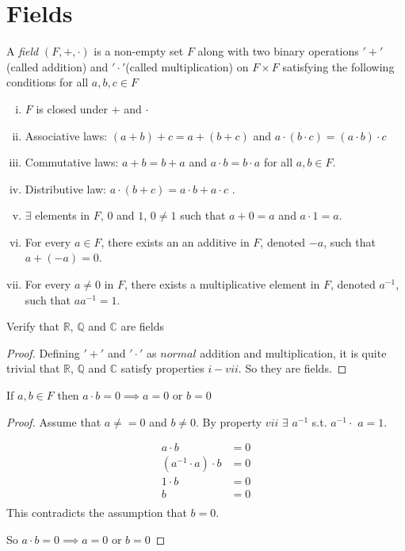 \section{Fields}

\begin{definition}
    A \textit{field} $(F,+,\cdot)$ is a non-empty set $F$ along with two binary operations $'+'$(called addition) and $'\cdot'$(called multiplication) on $F\times F$ satisfying the following conditions for all $a,b,c \in F$
    \begin{enumerate}[(i)]
        \item $F$ is closed under $+$ and $\cdot$
        \item Associative laws: $(a+b)+c=a+(b+c)$ and $a\cdot(b\cdot c)=(a\cdot b)\cdot c$ 
        \item Commutative laws: $a+b=b+a$ and $a\cdot b=b\cdot a$ for all $a,b\in F$.
        \item Distributive law: $a\cdot(b+c)=a\cdot b+a\cdot c$ . 
        \item $\exists$ elements in $F$, $0$ and $1$, $0 \neq 1$ such that $a+0=a$ and $a\cdot 1=a$.
        \item For every $a\in F$, there exists an an additive in $F$, denoted $-a$, such that $a+(-a)=0$.
        \item For every $a\neq 0$ in $F$, there exists a multiplicative element in $F$, denoted $a^{-1}$, such that $aa^{-1}=1$.
    \end{enumerate}
\end{definition}

\vspace{2mm}

\begin{exercise}
    Verify that $\mathbb{R}$, $\mathbb{Q}$ and $\mathbb{C}$ are fields
\end{exercise}
\begin{proof}

Defining $'+'$ and $'\cdot'$ as $normal$ addition and multiplication, it is quite trivial that $\mathbb{R}$, $\mathbb{Q}$ and $\mathbb{C}$ satisfy properties $i-vii$. So they are fields.
\end{proof}

\begin{exercise}
    If $a,b \in F$ then $a\cdot b=0 \implies a=0 $ or $b=0$ 
\end{exercise}
\begin{proof}
Assume that $a\neq =0$ and $b \neq 0$. By property $vii$ $\exists$ $a^{-1}$  s.t. $a^{-1} \cdot$ 
$ a=1$. 

\begin{align*}
    a \cdot b &= 0 \\
    (a^{-1} \cdot a) \cdot b &=0 \\
    1 \cdot b &=0 \\
    b &=0 \\
\end{align*}
This contradicts the assumption that $b=0$.

So $a\cdot b=0 \implies a=0 $ or $b=0$ 
\end{proof}

